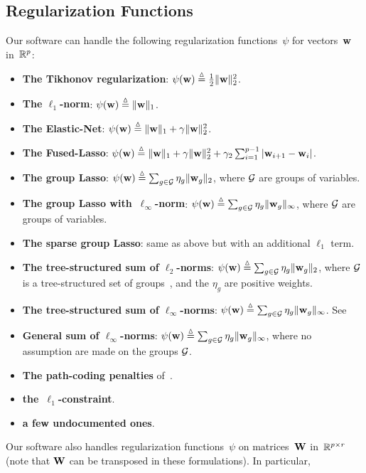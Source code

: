 \documentclass[a4paper, 11pt]{article}
\begin{document}
\subsection{Regularization Functions}
Our software can handle the following regularization functions~$\psi$ for vectors~${\mathbf w}$ in~${\mathbb R}^p$:
\begin{itemize}
\item \textbf{The Tikhonov regularization}: $\psi({\mathbf w}) \stackrel{\vartriangle}{=} \frac{1}{2}\|{\mathbf w}\|_2^2$.
\item \textbf{The $\ell_1$-norm}: $\psi({\mathbf w}) \stackrel{\vartriangle}{=} \|{\mathbf w}\|_1$.
\item \textbf{The Elastic-Net}: $\psi({\mathbf w}) \stackrel{\vartriangle}{=} \|{\mathbf w}\|_1+\gamma\|{\mathbf w}\|_2^2$.
\item \textbf{The Fused-Lasso}: $\psi({\mathbf w}) \stackrel{\vartriangle}{=} \|{\mathbf w}\|_1+\gamma\|{\mathbf w}\|_2^2+\gamma_2\sum_{i=1}^{p-1}|{\mathbf w}_{i+1}-{\mathbf w}_i|$.
\item \textbf{The group Lasso}: $\psi({\mathbf w}) \stackrel{\vartriangle}{=} \sum_{g \in {\mathcal G}} \eta_g \|{\mathbf w}_g\|_2$, where ${\mathcal G}$ are groups of variables.
\item \textbf{The group Lasso with~$\ell_\infty$-norm}: $\psi({\mathbf w}) \stackrel{\vartriangle}{=} \sum_{g \in {\mathcal G}} \eta_g \|{\mathbf w}_g\|_\infty$, where ${\mathcal G}$ are groups of variables.
\item \textbf{The sparse group Lasso}: same as above but with an additional $\ell_1$ term.
\item \textbf{The tree-structured sum of $\ell_2$-norms}: $\psi({\mathbf w}) \stackrel{\vartriangle}{=} \sum_{g \in {\mathcal G}} \eta_g \|{\mathbf w}_g\|_2$, where ${\mathcal G}$ is a tree-structured set of groups~\cite{jenatton3}, and the $\eta_g$ are positive weights.
\item \textbf{The tree-structured sum of $\ell_\infty$-norms}: $\psi({\mathbf w}) \stackrel{\vartriangle}{=} \sum_{g \in {\mathcal G}} \eta_g \|{\mathbf w}_g\|_\infty$. See \cite{jenatton3}
\item \textbf{General sum of $\ell_\infty$-norms}:  $\psi({\mathbf w}) \stackrel{\vartriangle}{=} \sum_{g \in {\mathcal G}} \eta_g \|{\mathbf w}_g\|_\infty$, where no assumption are made on the groups ${\mathcal G}$.
\item \textbf{The path-coding penalties} of~\cite{mairal14}.
\item \textbf{the~$\ell_1$-constraint}.
\item \textbf{a few undocumented ones}.
\end{itemize}
Our software also handles regularization functions~$\psi$ on matrices~${\mathbf W}$ in~${\mathbb R}^{p \times r}$ (note that ${\mathbf W}$ can be transposed in these formulations). In particular,
\end{document}
